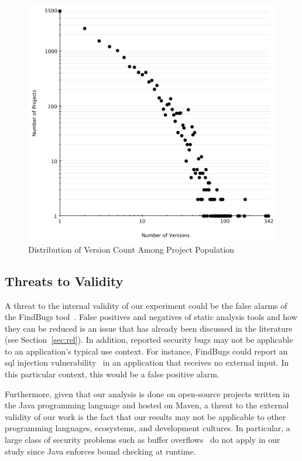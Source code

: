 \documentclass[letterpaper,twocolumn,10pt]{article}
\begin{document}
\begin{figure}[t]
	\centering
	\includegraphics[scale=0.37]{version_count.pdf}
	\caption{Distribution of Version Count Among Project Population}
	\label{fig:version-count}
\end{figure}

\subsection{Threats to Validity}
\label{sec:threats}

A threat to the internal validity of our experiment could be the false alarms of the
FindBugs tool~\cite{AP10, HP04}. False positives and negatives of static analysis tools and
how they can be reduced is an issue that has already been discussed in the literature
(see Section~\ref{sec:rel}).
In addition, reported security bugs may not be applicable to an
application's typical use context.
For instance, FindBugs could report an {\sc sql} injection vulnerability~\cite{RL12}
in an application that receives no external input.
In this particular context, this would be a false positive alarm.

Furthermore, given that our analysis is done on open-source projects
written in the Java programming language and hosted on Maven,
a threat to the external validity of our work
is the fact that our results may not be applicable to other
programming languages, ecosystems, and development cultures.
In particular, a large class of security problems such as
buffer overflows~\cite{K11} do not apply in our study since
Java enforces bound checking at runtime.
\end{document}
